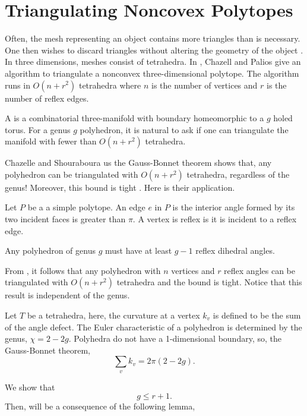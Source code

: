 \section{Triangulating Noncovex Polytopes}
\label{sec:triangulating}


Often, the mesh representing
an object contains more triangles than is necessary. One then wishes to
discard triangles without altering the geometry of the object \cite{simplify-mesh-1999}.
In three dimensions, meshes consist of tetrahedra. 
In \cite{triangulating-polytope-1990}, Chazell and Palios give an
algorithm to triangulate a nonconvex three-dimensional polytope.
The algorithm runs in $O(n+r^2)$ tetrahedra where $n$ is the number
of vertices and $r$ is the number of reflex edges.

A   is a combinatorial three-manifold with 
boundary homeomorphic to a $g$ holed torus.
For a genus $g$ polyhedron, it is natural to ask if one can 
triangulate the manifold with fewer than $O(n+r^2)$ tetrahedra.


Chazelle and Shouraboura us the 
 Gauss-Bonnet theorem shows that, any polyhedron
can be triangulated with $O(n+r^2)$ tetrahedra, regardless  of 
the genus! Moreover, this bound is tight \cite{tetra-bounds-c-s-1994}.
Here is their application.

Let $P$ be a a simple polytope. An edge $e$ in $P$ is
 the interior angle formed by its two incident faces
is greater than $\pi$.
A vertex is reflex is it is incident to a reflex edge.

\begin{theorem}\label{thm:reflex}

Any polyhedron of genus $g$ must have 
at least $g-1$ reflex dihedral angles. 

\end{theorem}

From , it follows that any polyhedron
with $n$ vertices and $r$ reflex angles
can be triangulated with $O(n+r^2)$ tetrahedra 
and the bound is tight. Notice that this result is independent
of the genus.

Let $T$ be a tetrahedra, here, the curvature at a vertex $k_v$ is defined to
be the sum of the angle defect.
The Euler characteristic of a polyhedron is determined by the genus,
$\chi=2-2g$.
Polyhedra do not have a 1-dimensional boundary, 
so, the Gauss-Bonnet theorem,
$$\sum_vk_v=2\pi (2-2g).$$

We show that
$$g\leq r+1.$$ 
Then,  will be a consequence of the following
lemma,


